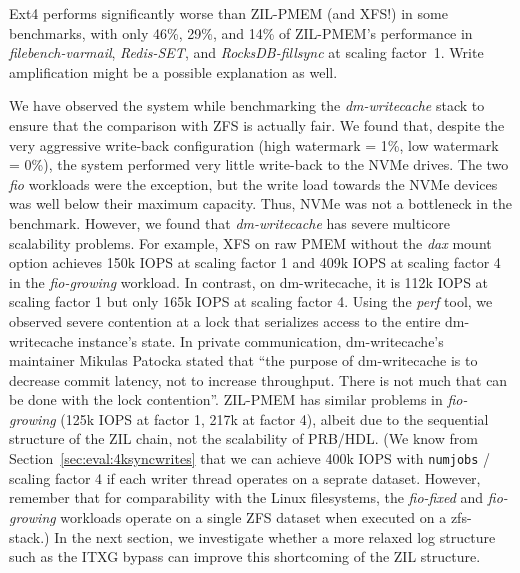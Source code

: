 \documentclass[12pt,a4paper,twoside]{book}
\begin{document}
{Ext4 performs significantly worse than ZIL-PMEM (and XFS!) in some benchmarks, with only 46\%, 29\%, and 14\% of ZIL-PMEM's performance in \textit{filebench-varmail}, \textit{Redis-SET}, and \textit{RocksDB-fillsync} at scaling factor~1.
Write amplification might be a possible explanation as well.

We have observed the system while benchmarking the \textit{dm-writecache} stack to ensure that the comparison with ZFS is actually fair.
We found that, despite the very aggressive write-back configuration (high watermark = 1\%, low watermark = 0\%), the system performed very little write-back to the NVMe drives.
The two \textit{fio} workloads were the exception, but the write load towards the NVMe devices was well below their maximum capacity.
Thus, NVMe was not a bottleneck in the benchmark.
However, we found that \textit{dm-writecache} has severe multicore scalability problems.
For example, XFS on raw PMEM without the \textit{dax} mount option achieves 150k IOPS at scaling factor 1 and 409k IOPS at scaling factor 4 in the \textit{fio-growing} workload.
In contrast, on dm-writecache, it is 112k IOPS at scaling factor 1 but only 165k IOPS at scaling factor 4.
Using the \textit{perf} tool, we observed severe contention at a lock that serializes access to the entire dm-writecache instance's state.
In private communication, dm-writecache's maintainer Mikulas Patocka stated that ``the purpose of dm-writecache is to decrease commit latency, not to increase throughput. There is not much that can be done with the lock contention''.
ZIL-PMEM has similar problems in \textit{fio-growing} (125k IOPS at factor 1, 217k at factor 4), albeit due to the sequential structure of the ZIL chain, not the scalability of PRB/HDL.
(We know from Section~\ref{sec:eval:4ksyncwrites} that we can achieve 400k IOPS with \lstinline{numjobs} / scaling factor 4 if each writer thread operates on a seprate dataset.
 However, remember that for comparability with the Linux filesystems, the \textit{fio-fixed} and \textit{fio-growing} workloads operate on a single ZFS dataset when executed on a zfs-\* stack.)
In the next section, we investigate whether a more relaxed log structure such as the ITXG bypass can improve this shortcoming of the ZIL structure.


}
\end{document}
